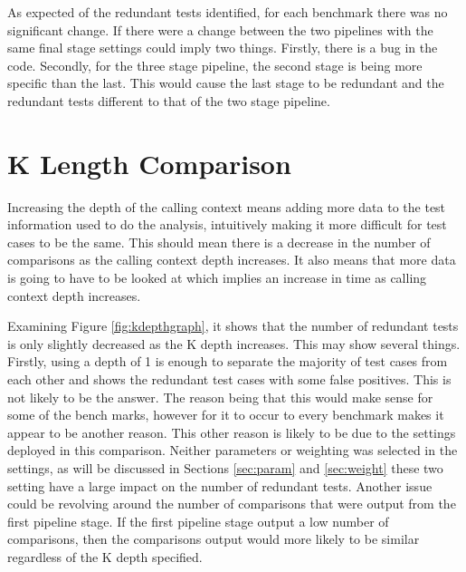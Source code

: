 As expected of the redundant tests identified, for each benchmark there was no significant change. If there were a change between the two pipelines with the same final stage settings could imply two things. Firstly, there is a bug in the code. Secondly, for the three stage pipeline, the second stage is being more specific than the last. This would cause the last stage to be redundant and the redundant tests different to that of the two stage pipeline.

\section{K Length Comparison}

Increasing the depth of the calling context means adding more data to the test information used to do the analysis, intuitively making it more difficult for test cases to be the same. This should mean there is a decrease in the number of comparisons as the calling context depth increases. It also means that more data is going to have to be looked at which implies an increase in time as calling context depth increases.

Examining Figure \ref{fig:kdepthgraph}, it shows that the number of redundant tests is only slightly decreased as the K depth increases. This may show several things. Firstly, using a depth of 1 is enough to separate the majority of test cases from each other and shows the redundant test cases with some false positives. This is not likely to be the answer. The reason being that this would make sense for some of the bench marks, however for it to occur to every benchmark makes it appear to be another reason. This other reason is likely to be due to the settings deployed in this comparison. Neither parameters or weighting was selected in the settings, as will be discussed in Sections \ref{sec:param} and \ref{sec:weight} these two setting have a large impact on the number of redundant tests. Another issue could be revolving around the number of comparisons that were output from the first pipeline stage. If the first pipeline stage output a low number of comparisons, then the comparisons output would more likely to be similar regardless of the K depth specified.


